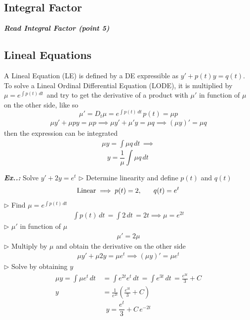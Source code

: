 \documentclass[a4paper]{article}
\begin{document}
\subsection{Integral Factor}
\setcounter{equation}{0}
\textbf{\textit{Read Integral Factor (point 5)}}

\subsection{Lineal Equations}
\setcounter{equation}{0}

A Lineal Equation (LE) is defined by a DE expressible as $y'+p(t)y=q(t)$. To solve a Lineal Ordinal Differential Equation (LODE), it is multiplied by $\mu=e^{ \int p(t) \, dt\, }$  and try to get the derivative of a product with $\mu'$ in function of $\mu$ on the other side, like so
$$
\mu'=D_{t}\mu=e^{ \int p(t) \, dt\,  }p(t)=\mu p
$$
\begin{align}
\mu y'+\mu py=\mu p\implies \mu y'+\mu'y=\mu q\implies(\mu y)'=\mu q
\end{align}
then the expression can be integrated
\begin{align}
\mu y=\int \mu q \, dt\, \implies
\end{align}
$$
\boxed{y=\frac{1}{\mu}\int \mu q \, dt\, }
$$
\vspace{1ex}\vspace{1ex}

\vspace{2ex}\textbf{\textit{Ex.\thesection.\theex: }}Solve $y'+2y=e^{t}$
$\triangleright$ Determine linearity and define $p(t)$ and $q(t)$
$$
\text{Linear}\implies p(t)=2,\hspace{4ex}q(t)=e^{ t }
$$
$\triangleright$ Find $\mu=e^{ \int p(t) \, dt\, }$
\begin{align}
\int p(t) \, dt\, =\int 2 \, dt\, =2t\implies \mu=e^{ 2t }
\end{align}
$\triangleright$ $\mu'$ in function of $\mu$
\begin{align}
\mu'=2\mu
\end{align}
$\triangleright$ Multiply by $\mu$ and obtain the derivative on the other side
\begin{align}
\mu y'+\mu 2y=\mu e^{ t }\implies(\mu y)'=\mu e^{ t }
\end{align}
$\triangleright$ Solve by obtaining $y$
\begin{align}
\mu y=\int \mu e^{ t } \, dt\, &=\int e^{ 2t }e^{ t } \, dt\, =\int e^{ 3t } \, dt\, =\frac{e^{ 3t }}{3}+C \\
y&=\frac{1}{e^{ 2t }}\left( \frac{e^{ 3t }}{3}+C \right)
\end{align}
$$
\boxed{y=\frac{e^{ t }}{3}+C\,e^{ -2t }}
$$
\end{document}
